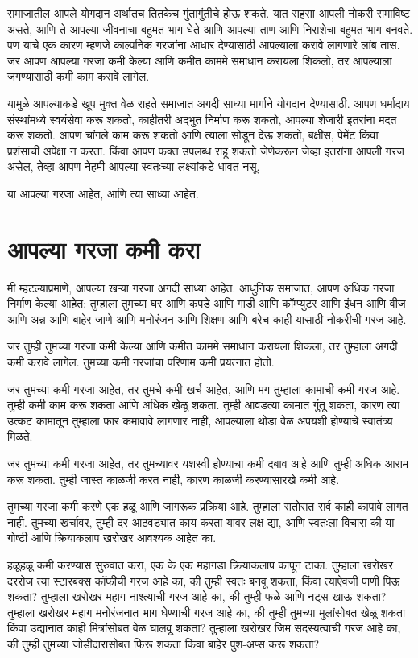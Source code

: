 समाजातील आपले योगदान अर्थातच तितकेच गुंतागुंतीचे होऊ शकते. यात सहसा आपली नोकरी समाविष्ट असते, आणि ते आपल्या जीवनाचा बहुमत भाग घेते आणि आपल्या ताण आणि निराशेचा बहुमत भाग बनवते. पण याचे एक कारण म्हणजे काल्पनिक गरजांना आधार देण्यासाठी आपल्याला करावे लागणारे लांब तास. जर आपण आपल्या गरजा कमी केल्या आणि कमीत काममे समाधान करायला शिकलो, तर आपल्याला जगण्यासाठी कमी काम करावे लागेल.

यामुळे आपल्याकडे खूप मुक्त वेळ राहते समाजात अगदी साध्या मार्गाने योगदान देण्यासाठी. आपण धर्मादाय संस्थांमध्ये स्वयंसेवा करू शकतो, काहीतरी अद्भुत निर्माण करू शकतो, आपल्या शेजारी इतरांना मदत करू शकतो. आपण चांगले काम करू शकतो आणि त्याला सोडून देऊ शकतो, बक्षीस, पेमेंट किंवा प्रशंसाची अपेक्षा न करता. किंवा आपण फक्त उपलब्ध राहू शकतो जेणेकरून जेव्हा इतरांना आपली गरज असेल, तेव्हा आपण नेहमी आपल्या स्वतःच्या लक्ष्यांकडे धावत नसू.

या आपल्या गरजा आहेत, आणि त्या साध्या आहेत.

\chapter{आपल्या गरजा कमी करा}

मी म्हटल्याप्रमाणे, आपल्या खऱ्या गरजा अगदी साध्या आहेत. आधुनिक समाजात, आपण अधिक गरजा निर्माण केल्या आहेत: तुम्हाला तुमच्या घर आणि कपडे आणि गाडी आणि कॉम्प्युटर आणि इंधन आणि वीज आणि अन्न आणि बाहेर जाणे आणि मनोरंजन आणि शिक्षण आणि बरेच काही यासाठी नोकरीची गरज आहे.

जर तुम्ही तुमच्या गरजा कमी केल्या आणि कमीत काममे समाधान करायला शिकला, तर तुम्हाला अगदी कमी करावे लागेल. तुमच्या कमी गरजांचा परिणाम कमी प्रयत्नात होतो.

जर तुमच्या कमी गरजा आहेत, तर तुमचे कमी खर्च आहेत, आणि मग तुम्हाला कामाची कमी गरज आहे. तुम्ही कमी काम करू शकता आणि अधिक खेळू शकता. तुम्ही आवडत्या कामात गुंतू शकता, कारण त्या उत्कट कामातून तुम्हाला फार कमावावे लागणार नाही, आपल्याला थोडा वेळ अपयशी होण्याचे स्वातंत्र्य मिळते.

जर तुमच्या कमी गरजा आहेत, तर तुमच्यावर यशस्वी होण्याचा कमी दबाव आहे आणि तुम्ही अधिक आराम करू शकता. तुम्ही जास्त काळजी करत नाही, कारण काळजी करण्यासारखे कमी आहे.

तुमच्या गरजा कमी करणे एक हळू आणि जागरूक प्रक्रिया आहे. तुम्हाला रातोरात सर्व काही कापावे लागत नाही. तुमच्या खर्चावर, तुम्ही दर आठवड्यात काय करता यावर लक्ष द्या, आणि स्वतःला विचारा की या गोष्टी आणि क्रियाकलाप खरोखर आवश्यक आहेत का.

हळूहळू कमी करण्यास सुरुवात करा, एक के एक महागडा क्रियाकलाप कापून टाका. तुम्हाला खरोखर दररोज त्या स्टारबक्स कॉफीची गरज आहे का, की तुम्ही स्वतः बनवू शकता, किंवा त्याऐवजी पाणी पिऊ शकता? तुम्हाला खरोखर महाग नाश्त्याची गरज आहे का, की तुम्ही फळे आणि नट्स खाऊ शकता? तुम्हाला खरोखर महाग मनोरंजनात भाग घेण्याची गरज आहे का, की तुम्ही तुमच्या मुलांसोबत खेळू शकता किंवा उद्यानात काही मित्रांसोबत वेळ घालवू शकता? तुम्हाला खरोखर जिम सदस्यत्वाची गरज आहे का, की तुम्ही तुमच्या जोडीदारासोबत फिरू शकता किंवा बाहेर पुश-अप्स करू शकता?

